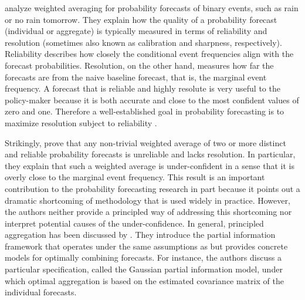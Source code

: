 \documentclass[11pt]{article}
\theoremstyle{definition}
\theoremstyle{definition}
\begin{document}
\cite{Ranjan08} analyze weighted averaging for probability forecasts of binary events, such as rain or no
rain tomorrow. They explain how the quality of a probability forecast
(individual or aggregate) is typically measured in terms of
reliability and resolution (sometimes also known as calibration and
sharpness, respectively). Reliability describes how closely the
conditional event frequencies align with the forecast
probabilities. Resolution, on the other hand, measures how far the
forecasts are from the naive baseline forecast, that is, the marginal
event frequency. A forecast that is reliable and highly resolute is
very useful to the policy-maker because it is both accurate and close
to the most confident values of zero and one. Therefore a
well-established goal in probability forecasting is to maximize resolution subject to
reliability \citep{murphy1987general, gneiting2007probabilistic}.


Strikingly, \cite{Ranjan08} prove that any non-trivial weighted average
of two or more distinct and reliable probability forecasts is
unreliable and lacks resolution. In particular, they explain that such
a weighted average is under-confident in a sense that it is overly
close to the marginal event frequency.  This result is an important
contribution to the probability forecasting research in part
because it points out a dramatic shortcoming of methodology that is
used widely in practice. However, the authors neither provide a
principled way of addressing this shortcoming nor interpret potential causes of the under-confidence. In general, principled aggregation has been discussed by \cite{satopaamodeling2, satopaamodeling}. They introduce the partial information 
framework that operates under the same assumptions as \cite{Ranjan08} but provides concrete models for
optimally combining forecasts. For instance, the authors discuss a particular specification, called the Gaussian partial information model, under which optimal aggregation is based on the estimated covariance matrix of the individual forecasts. 
%
\end{document}
